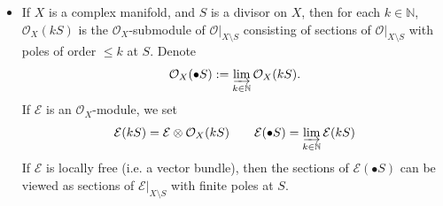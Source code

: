 \documentclass[11pt,b5paper,notitlepage]{article}
\theoremstyle{definition}
\theoremstyle{plain}
\newcommand{\mc}{\mathcal}
\newcommand{\blt}{\bullet}
\newcommand{\Nbb}{\mathbb N}
\newcommand{\<}{\left\langle}
\renewcommand{\>}{\right\rangle}
\newcommand{\MO}{\mathcal{O}}
\newcommand{\ME}{\mathcal{E}}
\numberwithin{equation}{subsection}
\begin{document}
\begin{subappendices}
\begin{itemize}
    \item If $X$ is a complex manifold,  and $S$ is a divisor on $X$, then for each $k\in \Nbb$, $\mc O_X(kS)$ is the $\mc O_X$-submodule of $\MO\vert_{X\setminus S}$ consisting of sections of $\MO\vert_{X\setminus S}$ with poles of order $\leq k$ at $S$. Denote 
    \begin{align*}
        \MO_X(\blt S):=\varinjlim_{k\in \Nbb}\MO_X(k S).
    \end{align*}
If $\ME$ is an $\MO_X$-module, we set \index{ES@$\mc E(kS),\mc E(\blt S)$}
    \begin{gather*}
\mc E(kS)=\mc E\otimes\mc O_X(kS)\qquad \mc E(\blt S)=\varinjlim_{k\in \Nbb}\ME(k S)
    \end{gather*}
    If $\mc E$ is locally free (i.e. a vector bundle), then the sections of $\mc E(\blt S)$ can be viewed as sections of $\mc E|_{X\setminus S}$ with finite poles at $S$.
    

\end{itemize}
\end{subappendices}
\end{document}
